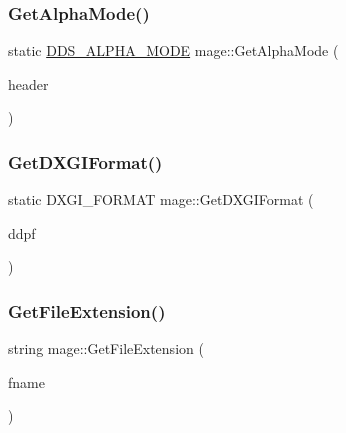 \subsubsection{\texorpdfstring{Get\+Alpha\+Mode()}{GetAlphaMode()}}
{\footnotesize\ttfamily static \hyperlink{namespacemage_a0c586a2bad862f4858900ca121ca80c2}{D\+D\+S\+\_\+\+A\+L\+P\+H\+A\+\_\+\+M\+O\+DE} mage\+::\+Get\+Alpha\+Mode (\begin{DoxyParamCaption}\item[{\+\_\+\+In\+\_\+ const \hyperlink{structmage_1_1_d_d_s___h_e_a_d_e_r}{D\+D\+S\+\_\+\+H\+E\+A\+D\+ER} $\ast$}]{header }\end{DoxyParamCaption})\hspace{0.3cm}{\ttfamily [static]}}

\hypertarget{namespacemage_a4fecf9823aec7c5ba078acf6bd73f983}{}\label{namespacemage_a4fecf9823aec7c5ba078acf6bd73f983} 
\subsubsection{\texorpdfstring{Get\+D\+X\+G\+I\+Format()}{GetDXGIFormat()}}
{\footnotesize\ttfamily static D\+X\+G\+I\+\_\+\+F\+O\+R\+M\+AT mage\+::\+Get\+D\+X\+G\+I\+Format (\begin{DoxyParamCaption}\item[{const \hyperlink{structmage_1_1_d_d_s___p_i_x_e_l_f_o_r_m_a_t}{D\+D\+S\+\_\+\+P\+I\+X\+E\+L\+F\+O\+R\+M\+AT} \&}]{ddpf }\end{DoxyParamCaption})\hspace{0.3cm}{\ttfamily [static]}}

\hypertarget{namespacemage_aec46035d0a6e15632a44ac88619fb675}{}\label{namespacemage_aec46035d0a6e15632a44ac88619fb675} 
\subsubsection{\texorpdfstring{Get\+File\+Extension()}{GetFileExtension()}\hspace{0.1cm}{\footnotesize\ttfamily [1/2]}}
{\footnotesize\ttfamily string mage\+::\+Get\+File\+Extension (\begin{DoxyParamCaption}\item[{const string \&}]{fname }\end{DoxyParamCaption})}

